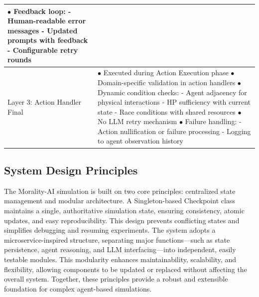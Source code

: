 \begin{table}[htbp]
\begin{tabular}{p{2.5cm}p{10cm}}
    $\bullet$ Feedback loop: \newline
    \quad - Human-readable error messages \newline
    \quad - Updated prompts with feedback \newline
    \quad - Configurable retry rounds \\
    \midrule
    Layer 3: Action Handler Final & 
    $\bullet$ Executed during Action Execution phase \newline
    $\bullet$ Domain-specific validation in action handlers \newline
    $\bullet$ Dynamic condition checks: \newline
    \quad - Agent adjacency for physical interactions \newline
    \quad - HP sufficiency with current state \newline
    \quad - Race conditions with shared resources \newline
    $\bullet$ No LLM retry mechanism \newline
    $\bullet$ Failure handling: \newline
    \quad - Action nullification or failure processing \newline
    \quad - Logging to agent observation history \\
    \bottomrule
  \end{tabular}

\end{table}






\subsection{System Design Principles}
The Morality-AI simulation is built on two core principles: centralized state management and modular architecture. A Singleton-based Checkpoint class maintains a single, authoritative simulation state, ensuring consistency, atomic updates, and easy reproducibility. This design prevents conflicting states and simplifies debugging and resuming experiments.
The system adopts a microservice-inspired structure, separating major functions—such as state persistence, agent reasoning, and LLM interfacing—into independent, easily testable modules. This modularity enhances maintainability, scalability, and flexibility, allowing components to be updated or replaced without affecting the overall system. Together, these principles provide a robust and extensible foundation for complex agent-based simulations.




